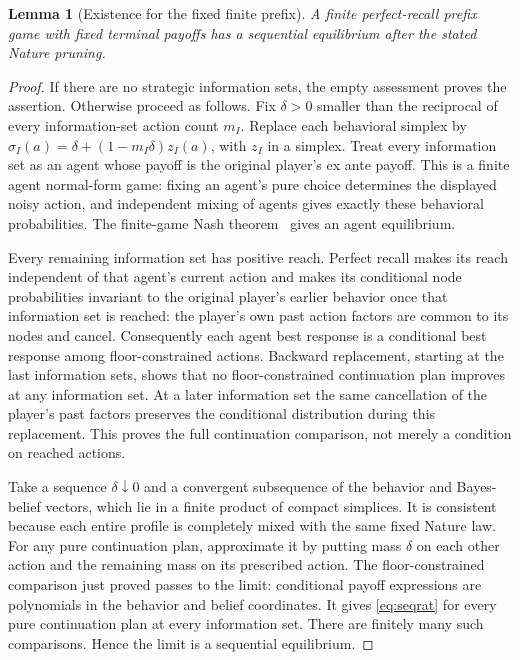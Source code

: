 \documentclass[11pt,a4paper]{article}
\numberwithin{equation}{section}
\newtheorem{lemma}[theorem]{Lemma}
\theoremstyle{definition}
\begin{document}
\begin{lemma}[Existence for the fixed finite prefix]\label{lem:se}
A finite perfect-recall prefix game with fixed terminal payoffs has a
sequential equilibrium after the stated Nature pruning.
\end{lemma}
\begin{proof}
If there are no strategic information sets, the empty assessment proves
the assertion. Otherwise proceed as follows.
Fix \(\delta>0\) smaller than the reciprocal of every information-set
action count \(m_I\). Replace each behavioral simplex by
\(\sigma_I(a)=\delta+(1-m_I\delta)z_I(a)\), with \(z_I\) in a simplex.
Treat every information set as an agent whose payoff is the original
player's ex ante payoff. This is a finite agent normal-form game: fixing
an agent's pure choice determines the displayed noisy action, and
independent mixing of agents gives exactly these behavioral probabilities.
The finite-game Nash theorem~\cite[Theorem~1]{nash} gives an agent
equilibrium.

Every remaining information set has positive reach. Perfect recall makes
its reach independent of that agent's current action and makes its
conditional node probabilities invariant to the original player's earlier
behavior once that information set is reached: the player's own past
action factors are common to its nodes and cancel. Consequently each
agent best response is a conditional best response among floor-constrained
actions. Backward replacement, starting at the last information sets,
shows that no floor-constrained continuation plan improves at any
information set. At a later information set the same cancellation of the
player's past factors preserves the conditional distribution during this
replacement. This proves the full continuation comparison, not merely
a condition on reached actions.

Take a sequence \(\delta\downarrow0\) and a convergent subsequence of the
behavior and Bayes-belief vectors, which lie in a finite product of compact
simplices. It is consistent because each entire profile is completely
mixed with the same fixed Nature law. For any pure continuation plan,
approximate it by putting mass \(\delta\) on each other action and the
remaining mass on its prescribed action. The floor-constrained comparison
just proved passes to the limit: conditional payoff expressions are
polynomials in the behavior and belief coordinates. It gives
\eqref{eq:seqrat} for every pure continuation plan at every information
set. There are finitely many such comparisons. Hence the limit is a
sequential equilibrium.
\end{proof}
\end{document}
